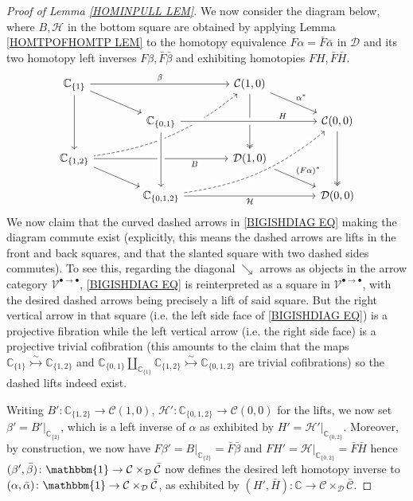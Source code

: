 \documentclass[a4paper,10pt
,draft
]{article}%
\numberwithin{equation}{section}
\numberwithin{figure}{section}
\theoremstyle{definition} %
\newcommand{\V}{\ensuremath{\mathcal V}}
\newcommand{\1}{\ensuremath{\mathbbm 1}}%
\begin{document}
\begin{proof}[Proof of Lemma \ref{HOMINPULL LEM}]
We now consider the diagram below, 
where $B, \mathcal{H}$ in the bottom square
are obtained by applying Lemma \ref{HOMTPOFHOMTP LEM}
to the homotopy equivalence 
$F\alpha = \bar{F} \bar{\alpha}$ in $\mathcal{D}$
and its two homotopy left inverses
$F\beta, \bar{F} \bar{\beta}$
and exhibiting homotopies
$F H, \bar{F} \bar{H}$.
\begin{equation}\label{BIGISHDIAG EQ}
\begin{tikzcd}[row sep = 15pt,column sep = 40pt]
	\mathbb{C}_{\{1\}} 	\ar{rr}{\beta} \ar{rd} \ar{dd}&&
	\mathcal{C}(1,0) \ar[twoheadrightarrow]{dd} \ar{dr}{\alpha^{\**}}
	\ar[dashed,leftarrow,bend left =15]{ddll}
\\
	&
	\mathbb{C}_{\{0,1\}} \arrow[crossing over]{rr}[near end]{H} &&
	\mathcal{C}(0,0)  
	\ar[twoheadrightarrow]{dd}
\\
	\mathbb{C}_{\{1,2\}} \ar{rr}[swap,near end]{B} \ar{rd} &&
	\mathcal{D}(1,0) \ar{rd}{(F\alpha)^{\**}}
\\
	&
	\mathbb{C}_{\{0,1,2\}}
	\ar[dashed,bend right =15,crossing over]{uurr}
	\ar{rr}[swap]{\mathcal{H}} \arrow[uu, leftarrow, crossing over] &&
	\mathcal{D}(0,0)
\end{tikzcd}
\end{equation}
We now claim that the curved dashed arrows in 
\eqref{BIGISHDIAG EQ}
making the diagram commute exist
(explicitly, this means the dashed arrows are lifts in the front and back squares, and that the slanted square with two dashed sides commutes).
To see this, regarding the diagonal $\searrow$ arrows as objects in the arrow category $\V^{\bullet \to \bullet}$, 
\eqref{BIGISHDIAG EQ}
is reinterpreted as a square in $\V^{\bullet \to \bullet}$,
with the desired dashed arrows being precisely a lift of said square.
But the right vertical arrow in that square
(i.e. the left side face of \eqref{BIGISHDIAG EQ}) is a projective fibration 
while the left vertical arrow 
(i.e. the right side face)
is a projective trivial cofibration
(this amounts to the claim that the maps
$\mathbb{C}_{\{1\}} \overset{\sim}{\rightarrowtail} \mathbb{C}_{\{1,2\}}$ and
$\mathbb{C}_{\{0,1\}} \amalg_{\mathbb{C}_{\{1\}}} \mathbb{C}_{\{1,2\}} \overset{\sim}{\rightarrowtail} \mathbb{C}_{\{0,1,2\}}$
are trivial cofibrations)
so the dashed lifts indeed exist.

Writing 
$B'\colon \mathbb{C}_{\{1,2\}} \to \mathcal{C}(1,0)$,
$\mathcal{H}' \colon \mathbb{C}_{\{0,1,2\}} \to \mathcal{C}(0,0)$
for the lifts,
we now set
$\beta' = B'|_{\mathbb{C}_{\{2\}}}$,
which is a left inverse of $\alpha$
as exhibited by $H' = \mathcal{H}'|_{\mathbb{C}_{\{0,2\}}}$.
Moreover, by construction, we now have
$F\beta' = B|_{\mathbb{C}_{\{2\}}} = \bar{F} \bar{\beta}$
and 
$FH' = \mathcal{H}|_{\mathbb{C}_{\{0,2\}}} = \bar{F} \bar{H}$
hence
$(\beta',\bar{\beta})\colon \mathbbm{1} \to
\mathcal{C} \times_{\mathcal{D}}\bar{\mathcal{C}}$
now defines the desired left homotopy inverse to 
$(\alpha,\bar{\alpha}) \colon \mathbbm{1} \to
\mathcal{C} \times_{\mathcal{D}}\bar{\mathcal{C}}$,
as exhibited by
$(H',\bar{H}) \colon \mathbb{C} \to
\mathcal{C} \times_{\mathcal{D}}\bar{\mathcal{C}}$.
\end{proof}
\end{document}
